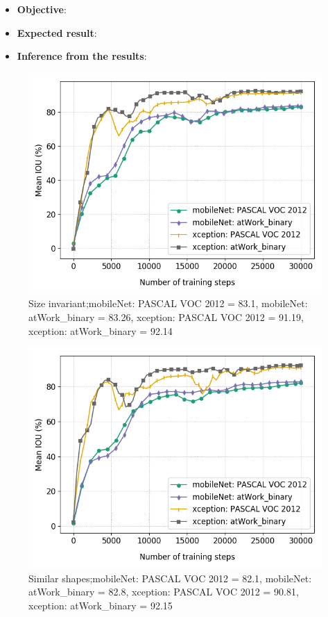	\begin{itemize}
		\item \textbf{Objective}:
		\item \textbf{Expected result}:
		\item \textbf{Inference from the results}:
	\end{itemize}

\begin{figure}
	\includegraphics[scale=0.4]{images/transfer_size}
	\caption{Size invariant;mobileNet: PASCAL VOC 2012 = 83.1, mobileNet: atWork\_binary = 83.26, xception: PASCAL VOC 2012 = 91.19, xception: atWork\_binary = 92.14}
\end{figure}

\begin{figure}
	\includegraphics[scale=0.4]{images/transfer_shape}
	\caption{Similar shapes;mobileNet: PASCAL VOC 2012 = 82.1, mobileNet: atWork\_binary = 82.8, xception: PASCAL VOC 2012 = 90.81, xception: atWork\_binary = 92.15}
\end{figure}

